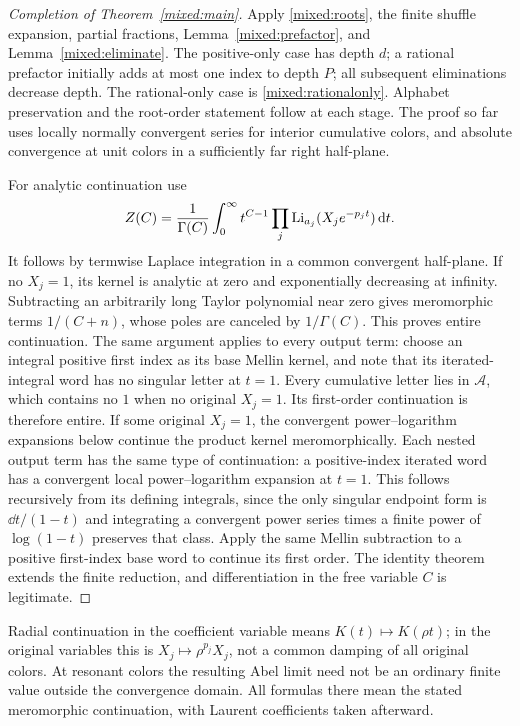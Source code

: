 \begin{proof}[Completion of Theorem~\ref{mixed:main}]
Apply \eqref{mixed:roots}, the finite shuffle expansion, partial
fractions, Lemma~\ref{mixed:prefactor}, and
Lemma~\ref{mixed:eliminate}. The positive-only case has depth $d$;
a rational prefactor initially adds at most one index to depth $P$;
all subsequent eliminations decrease depth. The rational-only case is
\eqref{mixed:rationalonly}. Alphabet preservation and the root-order
statement follow at each stage. The proof so far uses locally normally
convergent series for interior cumulative colors, and absolute
convergence at unit colors in a sufficiently far right half-plane.

For analytic continuation use
\begin{equation}\label{mixed:Mellin}
 Z(C)=\frac1{\Gamma(C)}\int_0^\infty
                   t^{C-1}\prod_j\operatorname{Li}_{a_j}(X_je^{-p_jt})\,\mathrm d t.
\end{equation}
It follows by termwise Laplace integration in a common convergent
half-plane. If no $X_j=1$, its kernel is analytic at zero and
exponentially decreasing at infinity. Subtracting an arbitrarily long
Taylor polynomial near zero gives meromorphic terms $1/(C+n)$,
whose poles are canceled by $1/\Gamma(C)$. This proves entire
continuation. The same argument applies to every output term: choose
an integral positive first index as its base Mellin kernel, and note
that its iterated-integral word has no singular letter at $t=1$.
Every cumulative letter lies in $\mathcal A$, which contains no $1$
when no original $X_j=1$. Its first-order continuation is therefore
entire. If some original $X_j=1$, the convergent power--logarithm
expansions below continue the product kernel meromorphically. Each
nested output term has the same type of continuation: a positive-index
iterated word has a convergent local power--logarithm expansion at
$t=1$. This follows recursively from its defining integrals, since
the only singular endpoint form is $\dd t/(1-t)$ and integrating a
convergent power series times a finite power of $\log(1-t)$ preserves
that class. Apply the same Mellin subtraction to a positive first-index
base word to continue its first order. The identity theorem extends
the finite reduction, and differentiation in the
free variable $C$ is legitimate.
\end{proof}

Radial continuation in the coefficient variable means $K(t)\mapsto
K(\rho t)$; in the original variables this is
$X_j\mapsto\rho^{p_j}X_j$, not a common damping of all original
colors. At resonant colors the resulting Abel limit need not be an
ordinary finite value outside the convergence domain. All formulas
there mean the stated meromorphic continuation, with Laurent
coefficients taken afterward.

